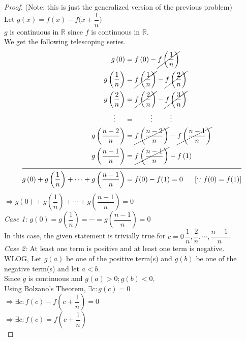 \documentclass[14]{article}
\theoremstyle{definition}
\theoremstyle{case}
\begin{document}
\begin{proof}
(Note: this is just the generalized version of the previous problem)\\
Let $g(x) = f(x) - f\Big(x + \dfrac{1}{n}\Big)$\\
$g$ is continuous in $\mathbb{R}$ since $f$ is continuous in $\mathbb{R}$.\\
We get the following telescoping series.
\begin{align*}
g\left(0\right) &= f\left(0\right) - \cancel{f\left(\dfrac{1}{n}\right)}\\
g\left(\dfrac{1}{n}\right) &= \cancel{f\left(\dfrac{1}{n}\right)} - \cancel{f\left(\dfrac{2}{n}\right)}\\
g\left(\dfrac{2}{n}\right) &= \cancel{f\left(\dfrac{2}{n}\right)} -\cancel{f\left(\dfrac{3}{n}\right)}\\
\vdots\;\;\;\;\; &=\;\;\;\;\;\;\;\;\vdots \;\;\;\;\;\;\;\;\; \vdots\\
g\left(\dfrac{n - 2}{n}\right) &= \cancel{f\left(\dfrac{n - 2}{n}\right)} - \cancel{f\left(\dfrac{n - 1}{n}\right)}\\
g\left(\dfrac{n - 1}{n}\right) &= \cancel{f\left(\dfrac{n - 1}{n}\right)} - f\left(1\right)\\
\cline{1-2}
g\left(0\right) + g\left(\dfrac{1}{n}\right) + \cdots + g\left(\dfrac{n - 1}{n}\right) &= f(0) - f(1) = 0 \;\;\;\;\;\; [\because f(0) = f(1)]
\end{align*}
$\Rightarrow g\left(0\right) + g\left(\dfrac{1}{n}\right) + \cdots + g\left(\dfrac{n - 1}{n}\right) = 0$\\
\textit{Case 1:} $g\left(0\right) = g\left(\dfrac{1}{n}\right) = \cdots = g\left(\dfrac{n - 1}{n}\right)= 0$\\
In this case, the given statement is trivially true for $c = 0\, \dfrac{1}{n}, \dfrac{2}{n}, \cdots, \dfrac{n-1}{n}$.\\
\textit{Case 2:} At least one term is positive and at least one term is negative.\\
WLOG, Let $g(a)$ be one of the positive term(s) and $g(b)$ be one of the negative term(s) and let $a < b$.\\
Since $g$ is continuous and $g(a) > 0; g(b) < 0$,\\ Using Bolzano's Theorem, $\exists c : g(c) = 0$\\
$\Rightarrow \exists c : f(c) - f\left(c + \dfrac{1}{n}\right) = 0$\\
$\Rightarrow \exists c : f(c) = f\left(c + \dfrac{1}{n}\right)$\\
\end{proof}
\pagebreak
\end{document}
